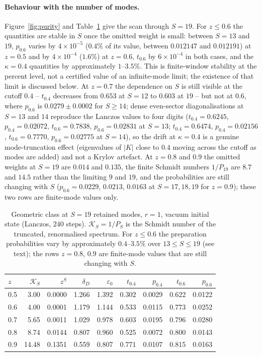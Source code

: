 \documentclass[11pt,a4paper]{article}
\begin{document}
\paragraph{Behaviour with the number of modes.}
Figure~\ref{fig:purity} and Table~\ref{tab:purity} give the scan through $S=19$. For $z\le0.6$ the quantities are stable in $S$ once the omitted weight is small: between $S=13$ and $19$, $p_{0.6}$ varies by $4\times10^{-5}$ ($0.4\%$ of its value, between $0.012147$ and $0.012191$) at $z=0.5$ and by $4\times10^{-4}$ ($1.6\%$) at $z=0.6$, $t_{0.6}$ by $6\times10^{-4}$ in both cases, and the $\kappa=0.4$ quantities by approximately $1$--$3.5\%$. This is finite-window stability at the percent level, not a certified value of an infinite-mode limit; the existence of that limit is discussed below. At $z=0.7$ the dependence on $S$ is still visible at the cutoff $0.4$ -- $t_{0.4}$ decreases from $0.653$ at $S=12$ to $0.603$ at $19$ -- but not at $0.6$, where $p_{0.6}$ is $0.0279\pm0.0002$ for $S\ge14$; dense even-sector diagonalisations at $S=13$ and $14$ reproduce the Lanczos values to four digits ($t_{0.4}=0.6245$, $p_{0.4}=0.02072$, $t_{0.6}=0.7838$, $p_{0.6}=0.02831$ at $S=13$; $t_{0.4}=0.6474$, $p_{0.4}=0.02156$, $t_{0.6}=0.7770$, $p_{0.6}=0.02775$ at $S=14$), so the drift at $\kappa=0.4$ is a genuine mode-truncation effect (eigenvalues of $|K|$ close to $0.4$ moving across the cutoff as modes are added) and not a Krylov artefact. At $z=0.8$ and $0.9$ the omitted weights at $S=19$ are $0.014$ and $0.135$, the finite Schmidt numbers $1/P_{19}$ are $8.7$ and $14.5$ rather than the limiting $9$ and $19$, and the probabilities are still changing with $S$ ($p_{0.6}=0.0229$, $0.0213$, $0.0163$ at $S=17,18,19$ for $z=0.9$); these two rows are finite-mode values only.
\begin{table}[t]
\centering\small
\begin{tabular}{lrrrrrrrr}
\toprule
$z$ & $\mathcal K_S$ & $z^S$ & $\delta_D$ & $\varepsilon_0$ & $t_{0.4}$ & $p_{0.4}$ & $t_{0.6}$ & $p_{0.6}$\\
\midrule
0.5 & 3.00 & 0.0000 & 1.266 & 1.392 & 0.302 & 0.0029 & 0.622 & 0.0122\\
0.6 & 4.00 & 0.0001 & 1.179 & 1.144 & 0.533 & 0.0115 & 0.773 & 0.0252\\
0.7 & 5.65 & 0.0011 & 1.029 & 0.978 & 0.603 & 0.0195 & 0.796 & 0.0280\\
0.8 & 8.74 & 0.0144 & 0.807 & 0.960 & 0.525 & 0.0072 & 0.800 & 0.0143\\
0.9 & 14.48 & 0.1351 & 0.559 & 0.807 & 0.771 & 0.0107 & 0.815 & 0.0163\\
\bottomrule
\end{tabular}
\caption{Geometric class at $S=19$ retained modes, $r=1$, vacuum initial state (Lanczos, $240$ steps). $\mathcal K_S=1/P_S$ is the Schmidt number of the truncated, renormalised spectrum. For $z\le0.6$ the preparation probabilities vary by approximately $0.4$--$3.5\%$ over $13\le S\le19$ (see text); the rows $z=0.8$, $0.9$ are finite-mode values that are still changing with $S$.}
\label{tab:purity}
\end{table}
\end{document}
